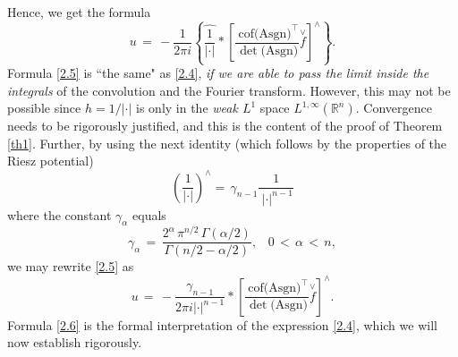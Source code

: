 \documentclass{amsart}
\theoremstyle{definition}
\numberwithin{equation}{section}
\begin{document}
Hence, we get the formula
\begin{equation} \label{2.5}
u \,= \, -\frac{1}{2\pi i} \left\{\widehat{ \frac{1}{|\cdot|}} \ast \left[ \frac{\ {\textrm{cof}} \big({\textrm{A}} {\textrm{sgn}}\big)^\top}{ \det \big({\textrm{A}} {\textrm{sgn}}\big)}\overset{\vee}{f}\right]^{\wedge}\right\}.
\end{equation}
Formula \eqref{2.5} is ``the same" as \eqref{2.4}, \emph{if we are able to pass the limit inside the integrals} of the convolution and the Fourier transform. However, this may not be possible since $h=1/|\cdot|$ is only in the \emph{weak $L^1$} space $L^{1,\infty}({\mathbb{R}}^n)$. Convergence needs to be rigorously justified, and this is the content of the proof of Theorem \ref{th1}. Further, by using the next identity (which follows by the properties of the Riesz potential)
\[
\left(\frac{1}{|\cdot|}\right)^{\wedge} =\, {\gamma}_{n-1} \frac{1}{\ |\cdot|^{n-1}}
\]
where the constant ${\gamma}_{\alpha}$ equals 
\[
{\gamma}_{\alpha} \,=\, \frac{2^{\alpha}\, \pi^{n/2} \,\Gamma({\alpha}/2)}{\Gamma(n/2-{\alpha}/2)}, \ \ \  \, 0\, <\, {\alpha}\, <\, n,
\]
we may rewrite \eqref{2.5} as
\begin{equation} \label{2.6}
u \, =\, -\frac{{\gamma}_{n-1}}{2\pi i |\cdot|^{n-1}} \ast \left[ \frac{\ {\textrm{cof}} \big({\textrm{A}} {\textrm{sgn}}\big)^\top}{ \det \big({\textrm{A}} {\textrm{sgn}}\big)}\overset{\vee}{f}\right]^{\wedge}.
\end{equation}
Formula \eqref{2.6} is the formal interpretation of the expression \eqref{2.4}, which we will now establish rigorously.
\end{document}
